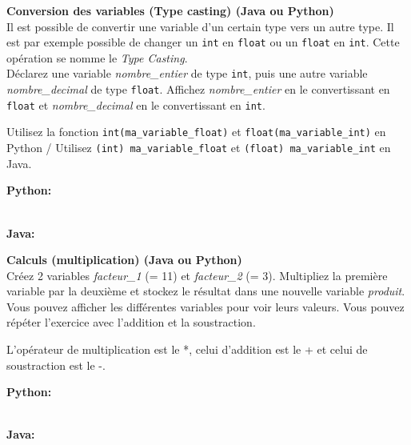  \begin{Exercice}[5 minutes] \textbf{Conversion des variables (Type casting) (Java ou Python)}\\
    Il est possible de convertir une variable d'un certain type vers un autre type. Il est par exemple possible de changer un \lstinline{int} en \lstinline{float} ou un \lstinline{float} en \lstinline{int}. Cette opération se nomme le \textit{Type Casting}. \\
    Déclarez une variable \textit{nombre\_entier} de type \lstinline{int}, puis une autre variable \textit{nombre\_decimal} de type \lstinline{float}. Affichez \textit{nombre\_entier} en le convertissant en \lstinline{float} et \textit{nombre\_decimal} en le convertissant en \lstinline{int}. \\
    
     \begin{conseil}
        Utilisez la fonction \lstinline{int(ma_variable_float)} et \lstinline{float(ma_variable_int)} en Python / Utilisez \lstinline{(int) ma_variable_float} et \lstinline{(float) ma_variable_int} en Java.
         
     \end{conseil}
     \begin{solution}
     
     \textbf{Python:}
     
     
     
     \textbf{\\Java:}
     
            
     \end{solution}   
 \end{Exercice}

 \begin{Exercice}[3 minutes] \textbf{Calculs (multiplication) (Java ou Python)}\\
 
    Créez 2 variables \textit{facteur\_1} (= 11) et \textit{facteur\_2} (= 3). Multipliez la première variable par la deuxième et stockez le résultat dans une nouvelle variable \textit{produit}. Vous pouvez afficher les différentes variables pour voir leurs valeurs. Vous pouvez répéter l'exercice avec l'addition et la soustraction. \\
    
     \begin{conseil}
           L'opérateur de multiplication est le *, celui d'addition est le + et celui de soustraction est le -.
         
     \end{conseil}
     \begin{solution}
     
     \textbf{Python:}
     
     
     \textbf{\\Java:}
     
            
     \end{solution}   
 \end{Exercice}
 
